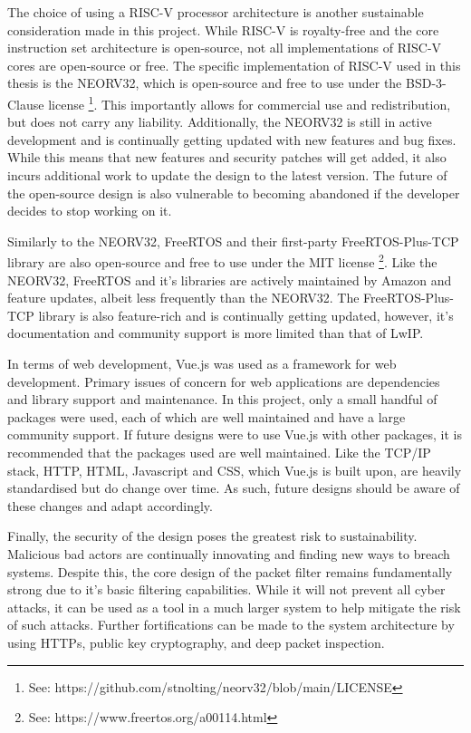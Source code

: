 The choice of using a RISC-V processor architecture is another sustainable consideration made in this project. While RISC-V is royalty-free and the core instruction set architecture is open-source, not all implementations of RISC-V cores are open-source or free. The specific implementation of RISC-V used in this thesis is the NEORV32, which is open-source and free to use under the BSD-3-Clause license \footnote[1]{See: https://github.com/stnolting/neorv32/blob/main/LICENSE}. This importantly allows for commercial use and redistribution, but does not carry any liability. Additionally, the NEORV32 is still in active development and is continually getting updated with new features and bug fixes. While this means that new features and security patches will get added, it also incurs additional work to update the design to the latest version. The future of the open-source design is also vulnerable to becoming abandoned if the developer decides to stop working on it. 


Similarly to the NEORV32, FreeRTOS and their first-party FreeRTOS-Plus-TCP library are also open-source and free to use under the MIT license \footnote[2]{See: https://www.freertos.org/a00114.html}. Like the NEORV32, FreeRTOS and it's libraries are actively maintained by Amazon and feature updates, albeit less frequently than the NEORV32. The FreeRTOS-Plus-TCP library is also feature-rich and is continually getting updated, however, it's documentation and community support is more limited than that of LwIP.



In terms of web development, Vue.js was used as a framework for web development. Primary issues of concern for web applications are dependencies and library support and maintenance. In this project, only a small handful of packages were used, each of which are well maintained and have a large community support. If future designs were to use Vue.js with other packages, it is recommended that the packages used are well maintained. Like the TCP/IP stack, HTTP, HTML, Javascript and CSS, which Vue.js is built upon, are heavily standardised but do change over time. As such, future designs should be aware of these changes and adapt accordingly.


Finally, the security of the design poses the greatest risk to sustainability. Malicious bad actors are continually innovating and finding new ways to breach systems. Despite this, the core design of the packet filter remains fundamentally strong due to it's basic filtering capabilities. While it will not prevent all cyber attacks, it can be used as a tool in a much larger system to help mitigate the risk of such attacks. Further fortifications can be made to the system architecture by using HTTPs, public key cryptography, and deep packet inspection.





